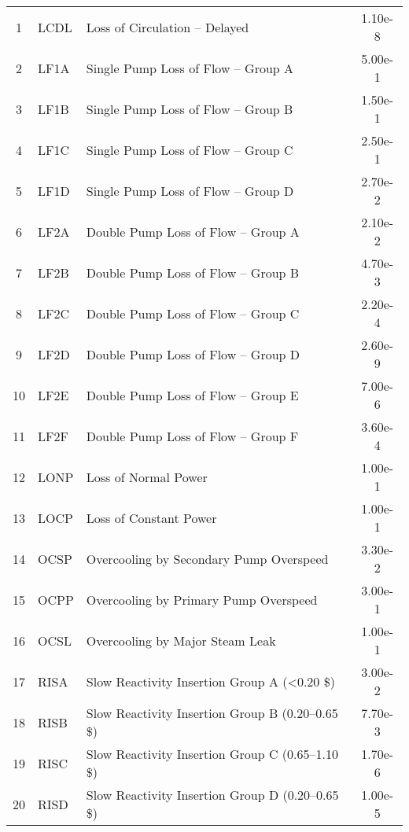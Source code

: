 \begin{longtable}{@{}c l l S@{}}
1  & LCDL  & Loss of Circulation -- Delayed                                 & 1.10e-8  \\
2  & LF1A  & Single Pump Loss of Flow -- Group A                            & 5.00e-1  \\
3  & LF1B  & Single Pump Loss of Flow -- Group B                            & 1.50e-1  \\
4  & LF1C  & Single Pump Loss of Flow -- Group C                            & 2.50e-1  \\
5  & LF1D  & Single Pump Loss of Flow -- Group D                            & 2.70e-2  \\
6  & LF2A  & Double Pump Loss of Flow -- Group A                            & 2.10e-2  \\
7  & LF2B  & Double Pump Loss of Flow -- Group B                            & 4.70e-3  \\
8  & LF2C  & Double Pump Loss of Flow -- Group C                            & 2.20e-4  \\
9  & LF2D  & Double Pump Loss of Flow -- Group D                            & 2.60e-9  \\
10 & LF2E  & Double Pump Loss of Flow -- Group E                            & 7.00e-6  \\
11 & LF2F  & Double Pump Loss of Flow -- Group F                            & 3.60e-4  \\
12 & LONP  & Loss of Normal Power                                           & 1.00e-1  \\
13 & LOCP  & Loss of Constant Power                                         & 1.00e-1  \\
14 & OCSP  & Overcooling by Secondary Pump Overspeed                        & 3.30e-2  \\
15 & OCPP  & Overcooling by Primary Pump Overspeed                          & 3.00e-1  \\
16 & OCSL  & Overcooling by Major Steam Leak                                & 1.00e-1  \\
17 & RISA  & Slow Reactivity Insertion Group A (<0.20 \$)                   & 3.00e-2  \\
18 & RISB  & Slow Reactivity Insertion Group B (0.20--0.65 \$)              & 7.70e-3  \\
19 & RISC  & Slow Reactivity Insertion Group C (0.65--1.10 \$)              & 1.70e-6  \\
20 & RISD  & Slow Reactivity Insertion Group D (0.20--0.65 \$)              & 1.00e-5  \\

\end{longtable}
